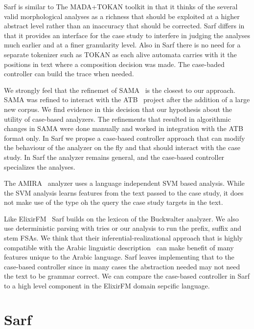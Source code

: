 \documentclass[11pt,letterpaper]{article}
\begin{document}
Sarf is similar to The MADA+TOKAN toolkit in that it thinks of
the several valid morphological analyses as a richness that 
should be exploited at a higher abstract level rather than
an inaccuracy that should be corrected. 
Sarf differs in that it provides an interface for the 
case study to interfere in judging the analyses much earlier and
at a finer granularity level. 
Also in Sarf there is no need for a separate tokenizer such as
TOKAN as each alive automata carries with it the positions in 
text where a composition decision was made. 
The case-baded controller can build the trace when needed. 


We strongly feel that the refinemet of SAMA~\cite{Maamouri:10} 
is the closest to our approach. SAMA was refined to interact with
the ATB~\cite{Maamouri:04} project after the addition of a large 
new corpus. We find evidence in this decision that our hypothesis
about the utility of case-based analyzers. The refinements
that resulted in algorithmic changes in SAMA were done manually
and worked in integration with the ATB format only. 
In Sarf we propse a case-based controller approach that can modify 
the behaviour of the analyzer on the fly and that should interact
with the case study. In Sarf the analyzer remains general, and the 
case-based controller specializes the analyses.

The AMIRA~\cite{Diab:07} analyzer uses 
a language independent SVM based analysis. 
While the SVM analysis learns features from the text passed to the case
study, it does not make use of the type oh the query the 
case study targets in the text. 

Like ElixirFM~\cite{Otakar:07} Sarf builds on the lexicon
of the Buckwalter analyzer. 
We also use deterministic parsing with tries or our analysis 
to run the prefix, suffix and stem FSAs. 
We think that their inferential-realizational approach 
that is highly compatible with the Arabic linguistic 
description~\cite{Badawi:04}
can make benefit of many features unique to the Arabic language.
Sarf leaves implementing that to the case-based controller
since in many cases the abstraction needed may not need the 
text to be grammar correct.
We can compare the case-based controller in Sarf to a high level
component in the ElixirFM domain sepcific language. 

\section{Sarf}
\label{sec:sarf}
\end{document}
